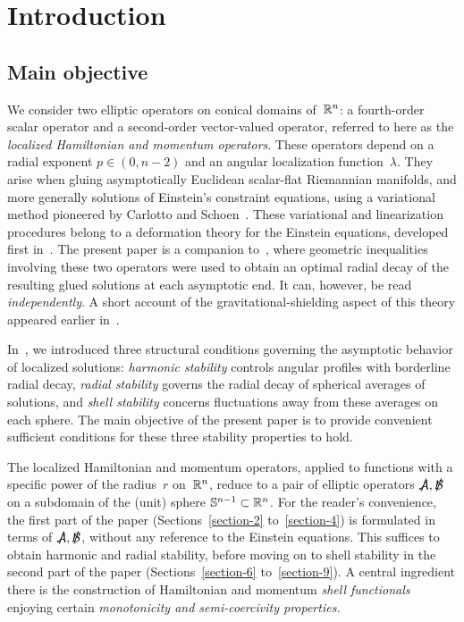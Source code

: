 \documentclass[11pt]{article}
\numberwithin{table}{section}
\numberwithin{equation}{section}
\numberwithin{table}{section}
\numberwithin{figure}{section}
\begin{document}

\section{Introduction}
\label{section-1}

\subsection{Main objective}
\label{sectionN1-1}

We consider two elliptic operators on conical domains of~$\mathbb R^n$: a fourth-order scalar operator and a second-order vector-valued  operator, referred to here as the \emph{localized Hamiltonian and momentum operators}.
These operators depend on a radial exponent $p\in(0,n-2)$ and an angular localization function~$\lambda$.
They arise when gluing asymptotically Euclidean scalar-flat Riemannian manifolds, and more generally solutions of Einstein's constraint equations, using a variational method pioneered by Carlotto and Schoen~\cite{CarlottoSchoen}.
These variational and linearization procedures belong to a deformation theory for the Einstein equations, developed first in~\cite{FischerMarsden-1973,Moncrief-1975}.
The present paper is a companion to~\cite{LL-optimal-main}, where geometric inequalities involving these two operators were used to obtain an optimal radial decay of the resulting glued solutions at each asymptotic end.
It can, however, be read \emph{independently}. A short account of the gravitational-shielding aspect of this theory appeared earlier in~\cite{LL-Letter}.

In~\cite{LL-optimal-main}, we introduced three structural conditions governing the asymptotic behavior of localized solutions: \emph{harmonic stability} controls angular profiles with borderline radial decay, \emph{radial stability} governs the radial decay of spherical averages of solutions, and \emph{shell stability} concerns fluctuations away from these averages on each sphere. The main objective of the present paper is to provide convenient sufficient conditions for these three stability properties to hold. 

The localized Hamiltonian and momentum operators, applied to functions with a specific power of the radius~$r$ on~$\mathbb R^n$, reduce to a pair of elliptic operators $\ssA,\ssB$ on a subdomain of the (unit) sphere $\mathbb S^{n-1}\subset\mathbb R^n$.
For the reader's convenience, the first part of the paper (Sections~\ref{section-2} to~\ref{section-4}) is formulated in terms of $\ssA,\ssB$, without any reference to the Einstein equations.
This suffices to obtain harmonic and radial stability, before moving on to shell stability in the second part of the paper (Sections~\ref{section-6} to~\ref{section-9}).
A central ingredient there is the construction of Hamiltonian and momentum \emph{shell functionals} enjoying certain \emph{monotonicity and semi-coercivity properties.}
\end{document}
